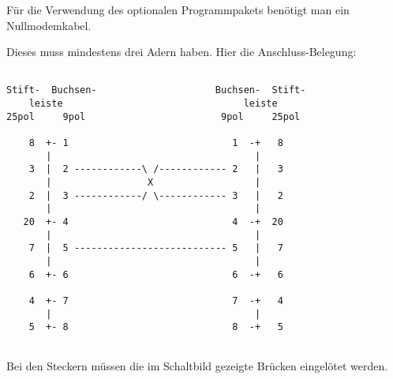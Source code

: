 
    Für die Verwendung des optionalen Programmpakets 
    benötigt man ein Null\-modem\-kabel.

    Dieses muss mindestens drei Adern haben. Hier die Anschluss-Belegung:

\begin{example}
%
\begin{verbatim}

Stift-  Buchsen-                     Buchsen-  Stift-
    leiste                                leiste
25pol     9pol                        9pol     25pol

    8  +- 1                             1  -+   8
       |                                    |
    3  |  2 ------------\ /------------ 2   |   3
       |                 X                  |
    2  |  3 ------------/ \------------ 3   |   2
       |                                    |
   20  +- 4                             4  -+  20
       |                                    |
    7  |  5 --------------------------- 5   |   7
       |                                    |
    6  +- 6                             6  -+   6

    4  +- 7                             7  -+   4
       |                                    |
    5  +- 8                             8  -+   5


\end{verbatim}
\end{example}


    Bei den Steckern müssen die im Schaltbild gezeigte Brücken 
    eingelötet werden.



